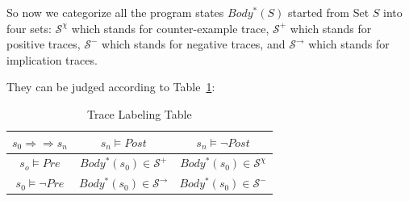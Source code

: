 So now we categorize all the program states $Body^*(S)$ started from Set $S$ into four sets:
$\mathcal{S}^\chi$ which stands for counter-example trace, 
$\mathcal{S}^+$ which stands for positive traces, 
$\mathcal{S}^-$ which stands for negative traces, 
and $\mathcal{S}^\rightarrow$ which stands for implication traces.

They can be judged according to Table~\ref{tab:labeling}: 
\begin{table}[htb]
\label{tab:labeling}
\centering
\begin{tabular}[float]{|c|c|c|}
\hline
$s_0 \Rightarrow \Rightarrow s_n$ & $s_n \models Post$            & $s_n \models \neg Post$\\
\hline
$s_o \models Pre$                 & $Body^*(s_0) \in \mathcal{S}^+$       & $Body^*(s_0) \in \mathcal{S}^\chi$\\
\hline
$s_0 \models \neg Pre$            & $Body^*(s_0) \in \mathcal{S}^\rightarrow$       & $Body^*(s_0) \in \mathcal{S}^-$\\
\hline
\end{tabular}
\caption{Trace Labeling Table}
\end{table}

